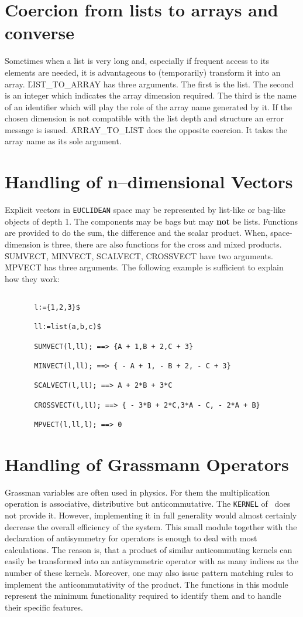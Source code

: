 \section{Coercion from lists to arrays and converse}
Sometimes when a list  is very long and,
 especially if frequent access to its elements are needed,
it is advantageous to (temporarily) transform it into an array.\nl
\f{LIST\_TO\_ARRAY} has three arguments. The first is the list. The
second is an integer which indicates the array dimension required. The
third is the name of an identifier which will play the role of the array
name generated by it. If the chosen dimension is not compatible with the
list depth and structure an error message is issued.\nl
\f{ARRAY\_TO\_LIST} does the opposite coercion. It takes the array
name as its sole argument.
\section{Handling of n--dimensional Vectors}
Explicit vectors in {\tt EUCLIDEAN} space may be represented by
list-like or bag-like objects of depth 1.
The components may be bags but may {\bf not} be lists.
Functions are provided to do the sum, the difference and the
scalar product. When, space-dimension is three, there are also functions
for the cross and mixed products.
\f{SUMVECT, MINVECT, SCALVECT, CROSSVECT} have two arguments.
\f{MPVECT} has three arguments. The following example
is sufficient to explain how they work:
\begin{verbatim}

       l:={1,2,3}$

       ll:=list(a,b,c)$

       SUMVECT(l,ll); ==> {A + 1,B + 2,C + 3}

       MINVECT(l,ll); ==> { - A + 1, - B + 2, - C + 3}

       SCALVECT(l,ll); ==> A + 2*B + 3*C

       CROSSVECT(l,ll); ==> { - 3*B + 2*C,3*A - C, - 2*A + B}

       MPVECT(l,ll,l); ==> 0

\end{verbatim}
\section{Handling of Grassmann Operators}
Grassman variables are often used in physics. For them the multiplication
operation is associative, distributive but anticommutative. The
{\tt KERNEL} of \REDUCE\ does not provide it. However, implementing
it in full generality would almost
certainly decrease the overall efficiency of the system. This small
module together with the declaration of antisymmetry for operators is
enough to deal with most calculations. The reason is, that a
product of similar anticommuting kernels can easily  be transformed
into an antisymmetric operator with as many indices as the number of
these kernels. Moreover, one may also issue pattern matching rules
to implement the anticommutativity of the product.
The functions in this module represent the minimum functionality
required to identify them and to handle their specific features.

